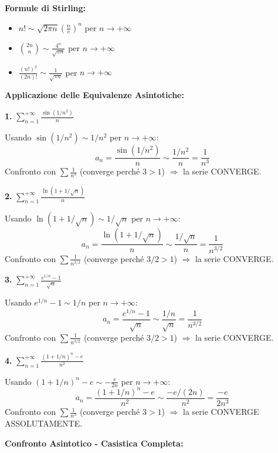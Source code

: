 \begin{enumerate}
\begin{info}
    \textbf{Formule di Stirling:}
    \begin{itemize}
        \item $n! \sim \sqrt{2\pi n}\left(\frac{n}{e}\right)^n$ per $n \to +\infty$
        \item $\binom{2n}{n} \sim \frac{4^n}{\sqrt{\pi n}}$ per $n \to +\infty$
        \item $\frac{(n!)^2}{(2n)!} \sim \frac{1}{\sqrt{\pi n}}$ per $n \to +\infty$
    \end{itemize}
    \end{info}

    \begin{esempio}
    \textbf{Applicazione delle Equivalenze Asintotiche:}
    
    \textbf{1.} $\sum_{n=1}^{+\infty} \frac{\sin(1/n^2)}{n}$
    
    Usando $\sin(1/n^2) \sim 1/n^2$ per $n \to +\infty$:
    \[ a_n = \frac{\sin(1/n^2)}{n} \sim \frac{1/n^2}{n} = \frac{1}{n^3} \]
    Confronto con $\sum \frac{1}{n^3}$ (converge perché $3 > 1$) $\Rightarrow$ la serie CONVERGE.
    
    \textbf{2.} $\sum_{n=1}^{+\infty} \frac{\ln(1 + 1/\sqrt{n})}{n}$
    
    Usando $\ln(1 + 1/\sqrt{n}) \sim 1/\sqrt{n}$ per $n \to +\infty$:
    \[ a_n = \frac{\ln(1 + 1/\sqrt{n})}{n} \sim \frac{1/\sqrt{n}}{n} = \frac{1}{n^{3/2}} \]
    Confronto con $\sum \frac{1}{n^{3/2}}$ (converge perché $3/2 > 1$) $\Rightarrow$ la serie CONVERGE.
    
    \textbf{3.} $\sum_{n=1}^{+\infty} \frac{e^{1/n} - 1}{\sqrt{n}}$
    
    Usando $e^{1/n} - 1 \sim 1/n$ per $n \to +\infty$:
    \[ a_n = \frac{e^{1/n} - 1}{\sqrt{n}} \sim \frac{1/n}{\sqrt{n}} = \frac{1}{n^{3/2}} \]
    Confronto con $\sum \frac{1}{n^{3/2}}$ (converge perché $3/2 > 1$) $\Rightarrow$ la serie CONVERGE.
    
    \textbf{4.} $\sum_{n=1}^{+\infty} \frac{(1+1/n)^n - e}{n^2}$
    
    Usando $(1+1/n)^n - e \sim -\frac{e}{2n}$ per $n \to +\infty$:
    \[ a_n = \frac{(1+1/n)^n - e}{n^2} \sim \frac{-e/(2n)}{n^2} = \frac{-e}{2n^3} \]
    Confronto con $\sum \frac{1}{n^3}$ (converge perché $3 > 1$) $\Rightarrow$ la serie CONVERGE ASSOLUTAMENTE.
    \end{esempio}
    
    \begin{strategia}
    \textbf{Confronto Asintotico - Casistica Completa:}
    

\end{strategia}
\end{enumerate}
